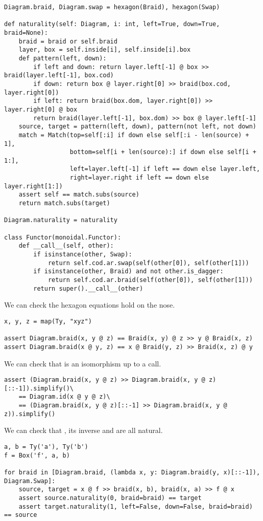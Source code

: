 \begin{python}
\begin{verbatim}
Diagram.braid, Diagram.swap = hexagon(Braid), hexagon(Swap)

def naturality(self: Diagram, i: int, left=True, down=True, braid=None):
    braid = braid or self.braid
    layer, box = self.inside[i], self.inside[i].box
    def pattern(left, down):
        if left and down: return layer.left[-1] @ box >> braid(layer.left[-1], box.cod)
        if down: return box @ layer.right[0] >> braid(box.cod, layer.right[0])
        if left: return braid(box.dom, layer.right[0]) >> layer.right[0] @ box
        return braid(layer.left[-1], box.dom) >> box @ layer.left[-1]
    source, target = pattern(left, down), pattern(not left, not down)
    match = Match(top=self[:i] if down else self[:i - len(source) + 1],
                  bottom=self[i + len(source):] if down else self[i + 1:],
                  left=layer.left[-1] if left == down else layer.left,
                  right=layer.right if left == down else layer.right[1:])
    assert self == match.subs(source)
    return match.subs(target)

Diagram.naturality = naturality

class Functor(monoidal.Functor):
    def __call__(self, other):
        if isinstance(other, Swap):
            return self.cod.ar.swap(self(other[0]), self(other[1]))
        if isinstance(other, Braid) and not other.is_dagger:
            return self.cod.ar.braid(self(other[0]), self(other[1]))
        return super().__call__(other)
\end{verbatim}
\end{python}

\begin{example}
We can check the hexagon equations hold on the nose.

\begin{verbatim}
x, y, z = map(Ty, "xyz")

assert Diagram.braid(x, y @ z) == Braid(x, y) @ z >> y @ Braid(x, z)
assert Diagram.braid(x @ y, z) == x @ Braid(y, z) >> Braid(x, z) @ y
\end{verbatim}

We can check that  is an isomorphism up to a  call.

\begin{verbatim}
assert (Diagram.braid(x, y @ z) >> Diagram.braid(x, y @ z)[::-1]).simplify()\
    == Diagram.id(x @ y @ z)\
    == (Diagram.braid(x, y @ z)[::-1] >> Diagram.braid(x, y @ z)).simplify()
\end{verbatim}

We can check that , its inverse and  are all natural.

\begin{verbatim}
a, b = Ty('a'), Ty('b')
f = Box('f', a, b)

for braid in [Diagram.braid, (lambda x, y: Diagram.braid(y, x)[::-1]), Diagram.Swap]:
    source, target = x @ f >> braid(x, b), braid(x, a) >> f @ x
    assert source.naturality(0, braid=braid) == target
    assert target.naturality(1, left=False, down=False, braid=braid) == source
\end{verbatim}
\end{example}

